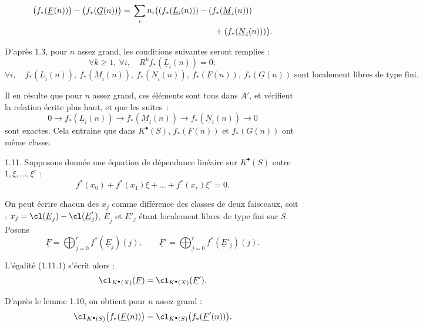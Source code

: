 
\[
\begin{aligned}
  \bigl(f_*(\underline{F}(n))\bigr)-\bigl(f_*(\underline{G}(n))\bigr)
  ={}&\sum_i n_i\bigl((f_*(\underline{L}_i(n)))-(f_*(\underline{M}_i(n)))\\
      &\hspace{35mm}+(f_*(\underline{N}_i(n)))\bigr).
\end{aligned}
\]

D'après 1.3,
pour \(n\) assez grand, les conditions suivantes seront remplies :
\[
  \forall k\geq1,\ \forall i,
  \quad R^k f_*(\underline{L}_i(n))=0;
\]
\[
  \forall i,
  \quad f_*(\underline{L}_i(n)),\ f_*(\underline{M}_i(n)),\ f_*(\underline{N}_i(n)),\ f_*(\underline{F}(n)),\ f_*(\underline{G}(n))
  \text{ sont localement libres de type fini.}
\]

Il en résulte que pour \(n\) assez grand, ces éléments sont tous dans \(A'\), et vérifient la relation écrite plus haut, et que les suites~:
\[
  0\longrightarrow f_*(\underline{L}_i(n))\longrightarrow f_*(\underline{M}_i(n))\longrightarrow f_*(\underline{N}_i(n))\longrightarrow0
\]
sont exactes. Cela entraine que dans \(K^{\bullet}(S)\), \(f_*(\underline{F}(n))\) et \(f_*(\underline{G}(n))\) ont même classe.

1.11. Supposons donnée une équation de dépendance linéaire sur \(K^{\bullet}(S)\) entre \(1,\xi,\ldots,\xi^r\) :
\begin{equation}\tag{1.11.1}
  f^*(x_0)+f^*(x_1)\xi+\ldots+f^*(x_r)\xi^r=0.
\end{equation}

On peut écrire chacun des \(x_j\) comme différence des classes de deux faisceaux, soit : \(x_j=\cl(\underline{E}_j)-\cl(\underline{E}'_j)\), \(\underline{E}_j\) et \(\underline{E}'_j\) étant localement libres de type fini sur \(S\). Posons
\[
  \underline{F}=\bigoplus_{j=0}^r f^*(\underline{E}_j)(j),
  \qquad
  \underline{F}'=\bigoplus_{j=0}^r f^*(\underline{E}'_j)(j).
\]

L'égalité (1.11.1) s'écrit alors :
\[
  \cl_{K^{\bullet}(X)}(\underline{F})=\cl_{K^{\bullet}(X)}(\underline{F}').
\]

D'après le lemme 1.10, on obtient pour \(n\) assez grand :
\[
  \cl_{K^{\bullet}(S)}\bigl(f_*(\underline{F}(n))\bigr)=\cl_{K^{\bullet}(S)}\bigl(f_*(\underline{F}'(n))\bigr).
\]
